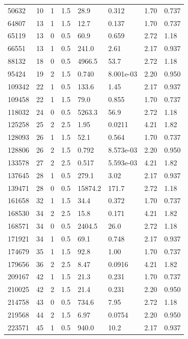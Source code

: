 \documentclass[preview]{standalone}
\begin{document}
{{\begin{tabular}{L{1.2cm}C{1.2cm} C{0.3cm}C{0.5cm} C{1.4cm}C{1.4cm} C{1.4cm}C{1.4cm}}
  50632  &    10  & 1     & 1.5 &  28.9  & 0.312  & 1.70 &  0.737   \\ 
  64807  &    13  & 1     & 1.5 &  12.7  & 0.137  & 1.70 &  0.737   \\ 
  65119  &    13  & 0     & 0.5 &  60.9  & 0.659  & 2.72 &  1.18   \\ 
  66551  &    13  & 1     & 0.5 &  241.0  & 2.61  & 2.17 &  0.937   \\ 
  88132  &    18  & 0     & 0.5 &  4966.5  & 53.7  & 2.72 &  1.18   \\ 
  95424  &    19  & 2     & 1.5 &  0.740  & 8.001e-03  & 2.20 &  0.950   \\ 
  109342  &    22  & 1     & 0.5 &  133.6  & 1.45  & 2.17 &  0.937   \\ 
  109458  &    22  & 1     & 1.5 &  79.0  & 0.855  & 1.70 &  0.737   \\ 
  118032  &    24  & 0     & 0.5 &  5263.3  & 56.9  & 2.72 &  1.18   \\ 
  125258  &    25  & 2     & 2.5 &  1.95  & 0.0211  & 4.21 &  1.82   \\ 
  128093  &    26  & 1     & 1.5 &  52.1  & 0.564  & 1.70 &  0.737   \\ 
  128806  &    26  & 2     & 1.5 &  0.792  & 8.573e-03  & 2.20 &  0.950   \\ 
  133578  &    27  & 2     & 2.5 &  0.517  & 5.593e-03  & 4.21 &  1.82   \\ 
  137645  &    28  & 1     & 0.5 &  279.1  & 3.02  & 2.17 &  0.937   \\ 
  139471  &    28  & 0     & 0.5 &  15874.2  & 171.7  & 2.72 &  1.18   \\ 
  161658  &    32  & 1     & 1.5 &  34.4  & 0.372  & 1.70 &  0.737   \\ 
  168530  &    34  & 2     & 2.5 &  15.8  & 0.171  & 4.21 &  1.82   \\ 
  168571  &    34  & 0     & 0.5 &  2404.5  & 26.0  & 2.72 &  1.18   \\ 
  171921  &    34  & 1     & 0.5 &  69.1  & 0.748  & 2.17 &  0.937   \\ 
  174679  &    35  & 1     & 1.5 &  92.8  & 1.00  & 1.70 &  0.737   \\ 
  179656  &    36  & 2     & 2.5 &  8.47  & 0.0916  & 4.21 &  1.82   \\ 
  209167  &    42  & 1     & 1.5 &  21.3  & 0.231  & 1.70 &  0.737   \\ 
  210025  &    42  & 2     & 1.5 &  21.4  & 0.231  & 2.20 &  0.950   \\ 
  214758  &    43  & 0     & 0.5 &  734.6  & 7.95  & 2.72 &  1.18   \\ 
  219568  &    44  & 2     & 1.5 &  6.97  & 0.0754  & 2.20 &  0.950   \\ 
  223571  &    45  & 1     & 0.5 &  940.0  & 10.2  & 2.17 &  0.937   \\ 
\hline 
\end{tabular} 

}}
\end{document}
